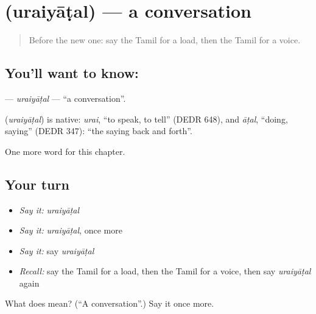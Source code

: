\section[\texorpdfstring{\ta{உரையாடல்} (uraiyāṭal)}{உரையாடல் (uraiyāṭal)}]{ (uraiyāṭal) — a conversation}

\label{lesson:TA-C245-uraiyatal}



\begin{quote}
Before the new one: say the Tamil for a load, then the Tamil for a voice.
\end{quote}

\subsection*{You'll want to know: }
\textbf{} — \emph{uraiyāṭal} — \textquotedblleft{}a conversation\textquotedblright{}.

\begin{cousinweb}
\textbf{} (\emph{uraiyāṭal}) is native: \emph{urai}, \textquotedblleft{}to speak, to tell\textquotedblright{} (DEDR 648), and \emph{āṭal}, \textquotedblleft{}doing, saying\textquotedblright{} (DEDR 347): \textquotedblleft{}the saying back and forth\textquotedblright{}.
\end{cousinweb}

\begin{grammarlens}[title={What you've built}]
One more word for this chapter.
\end{grammarlens}

\subsection*{Your turn}
\begin{itemize}
\raggedright
  \item \emph{Say it:} \emph{uraiyāṭal}
  \item \emph{Say it:} \emph{uraiyāṭal}, once more
  \item \emph{Say it:} say \emph{uraiyāṭal}
  \item \emph{Recall:} say the Tamil for a load, then the Tamil for a voice, then say \emph{uraiyāṭal} again
\end{itemize}

\begin{tcolorbox}[breakable,colback=teal!4,colframe=teal!35!black,title={Before you move on}]
What does  mean? (\textquotedblleft{}A conversation\textquotedblright{}.) Say it once more.
\end{tcolorbox}
